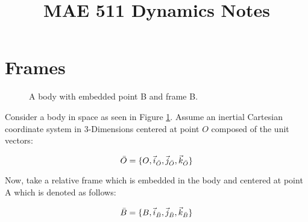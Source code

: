 \documentclass{article}
\begin{document}
	\title{MAE 511 Dynamics Notes}
	\maketitle
	
	\section{Frames}
	
	\begin{figure}[h]
		\centering
		\label{Fig1}
		\caption{A body with embedded point B and frame B.}
	\end{figure}
	
	Consider a body in space as seen in Figure \ref{Fig1}. 	Assume an inertial Cartesian coordinate system in 3-Dimensions centered at point $O$ composed of the unit vectors:
	
	\begin{equation}
	\bar{O} = \{{O},\vec{i}_{\bar{O}}, \vec{j}_{\bar{O}}, \vec{k}_{\bar{O}}\}
	\label{Eqn1}
	\end{equation}
	
	Now, take a relative frame which is embedded in the body and centered at point A which is denoted as follows:
	
	\begin{equation}
	\bar{B} = \{{B},\vec{i}_{\bar{B}}, \vec{j}_{\bar{B}}, \vec{k}_{\bar{B}}\}
	\end{equation}
	
\end{document}
